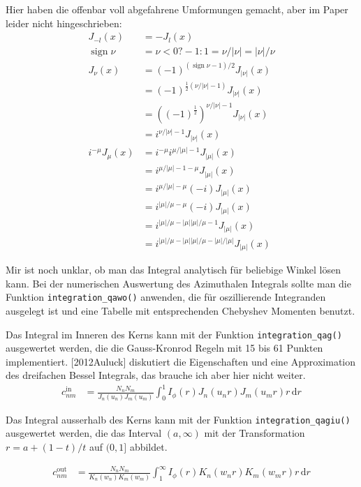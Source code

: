 \documentclass[DIV19,twocolumn]{scrartcl}
\DeclareMathOperator{\sign}{sign}
\begin{document}
Hier haben die offenbar voll abgefahrene Umformungen gemacht, aber im
Paper leider nicht hingeschrieben:
\begin{align}
J_{-l}(x) &= -J_l(x) \\
\sign \nu &= \nu<0 ? -1 : 1 = \nu/|\nu| = |\nu|/\nu \\
J_\nu(x) &= (-1)^{(\sign{\nu}-1)/2} J_{|\nu|}(x) \\ 
& = (-1)^{\frac{1}{2}(\nu/|\nu|-1)} J_{|\nu|}(x) \\ 
& = ((-1)^{\frac{1}{2}})^{\nu/|\nu|-1} J_{|\nu|}(x) \\ 
& = i^{\nu/|\nu|-1} J_{|\nu|}(x)\\
i^{-\mu} J_\mu(x) &= i^{-\mu} i^{\mu/|\mu|-1} J_{|\mu|}(x)\\
&= i^{\mu/|\mu|-1 -\mu } J_{|\mu|}(x) \\
&= i^{\mu/|\mu| -\mu } (-i) J_{|\mu|}(x) \\
&= i^{|\mu|/\mu-\mu} (-i) J_{|\mu|}(x) \\
&= i^{|\mu|/\mu-|\mu| |\mu| /\mu-1} J_{|\mu|}(x) \\
&= i^{|\mu|/\mu-|\mu| |\mu| /\mu-|\mu|/|\mu|} J_{|\mu|}(x)
\end{align}


Mir ist noch unklar, ob man das Integral analytisch f\"ur beliebige
Winkel l\"osen kann.  Bei der numerischen Auswertung des Azimuthalen
Integrals sollte man die Funktion \verb!integration_qawo()! anwenden,
die f\"ur oszillierende Integranden ausgelegt ist und eine Tabelle mit
entsprechenden Chebyshev Momenten benutzt.

Das Integral im Inneren des Kerns kann mit der Funktion
\verb!integration_qag()! ausgewertet werden, die die Gauss-Kronrod
Regeln mit 15 bis 61 Punkten implementiert.  [2012Auluck] diskutiert
die Eigenschaften und eine Approximation des dreifachen Bessel
Integrals, das brauche ich aber hier nicht weiter.
\begin{align}
    c_{nm}^\textrm{in}&=\frac{N_n N_m}{J_n(u_n) J_m(u_m)}
    \int_0^1\!\!\!\! I_\phi(r) J_n(u_n r) J_m(u_m r) r\, \textrm{d}r 
\end{align}

Das Integral ausserhalb des Kerns kann mit der Funktion
\verb!integration_qagiu()! ausgewertet werden, die das Interval
$(a,\infty)$ mit der Transformation $r=a+(1-t)/t$ auf $(0,1]$
abbildet.

\begin{align}
    c_{nm}^\textrm{out}&=\frac{N_n N_m}{K_n(w_n) K_m(w_m)}
    \int_1^\infty\!\!\!\! I_\phi(r) K_n(w_n r) K_m(w_m r) r\, \textrm{d}r 
\end{align}
\end{document}
